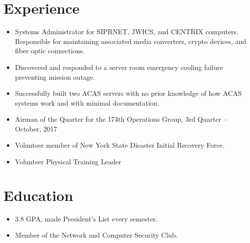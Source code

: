 \documentclass[11pt]{resume}
\author{Seth P. Sevier}
\begin{document}
\maketitle
\smallskip

\section{Experience}

\begin{itemize}
\item Systems Administrator for SIPRNET, JWICS, and CENTRIX computers.  Responsible for maintaining associated media converters, crypto devices, and fiber optic connections.
\item Discovered and responded to a server room emergency cooling failure preventing mission outage.
\item Successfully built two ACAS servers with no prior knowledge of how ACAS systems work and with minimal documentation.
\item Airman of the Quarter for the 174th Operations Group, 3rd Quarter -- October, 2017
\item Volunteer member of New York State Disaster Initial Recovery Force.
\item Volunteer Physical Training Leader
\end{itemize}

\section{Education}
\begin{itemize}
\item 3.8 GPA, made President's List every semester.
\item Member of the Network and Computer Security Club.
\end{itemize}


\end{document}
